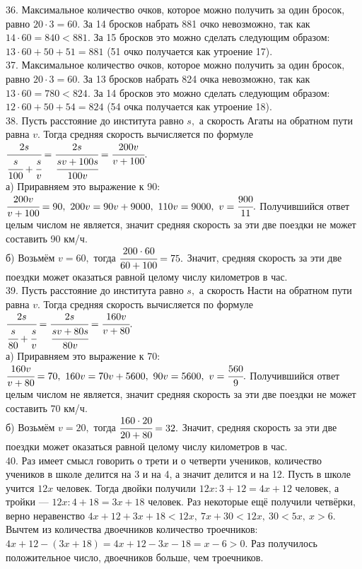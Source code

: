 \documentclass[12pt]{article}
\begin{document}
36. Максимальное количество очков, которое можно получить за один бросок, равно $20\cdot3=60.$ За 14 бросков набрать 881 очко невозможно, так как $14\cdot60=840<881.$ За 15 бросков это можно сделать следующим образом: $13\cdot60+50+51=881$ (51 очко получается как утроение 17).\\
37. Максимальное количество очков, которое можно получить за один бросок, равно $20\cdot3=60.$ За 13 бросков набрать 824 очка невозможно, так как $13\cdot60=780<824.$ За 14 бросков это можно сделать следующим образом: $12\cdot60+50+54=824$ (54 очка получается как утроение 18).\\
38. Пусть расстояние до института равно $s,$ а скорость Агаты на обратном пути равна $v.$ Тогда средняя скорость вычисляется по формуле $\cfrac{2s}{\cfrac{s}{100}+\cfrac{s}{v}}=\cfrac{2s}{\cfrac{sv+100s}{100v}}=\cfrac{200v}{v+100}.$\\
а) Приравняем это выражение к 90: $\cfrac{200v}{v+100}=90,\ 200v=90v+9000,\ 110v=9000,\ v=\cfrac{900}{11}.$ Получившийся ответ целым числом не является, значит средняя скорость за эти две поездки не может составить 90 км/ч.\\
б) Возьмём $v=60,$ тогда $\cfrac{200\cdot60}{60+100}=75.$ Значит, средняя скорость за эти две поездки может оказаться равной целому числу километров в час.\\
39. Пусть расстояние до института равно $s,$ а скорость Насти на обратном пути равна $v.$ Тогда средняя скорость вычисляется по формуле $\cfrac{2s}{\cfrac{s}{80}+\cfrac{s}{v}}=\cfrac{2s}{\cfrac{sv+80s}{80v}}=\cfrac{160v}{v+80}.$\\
а) Приравняем это выражение к 70: $\cfrac{160v}{v+80}=70,\ 160v=70v+5600,\ 90v=5600,\ v=\cfrac{560}{9}.$ Получившийся ответ целым числом не является, значит средняя скорость за эти две поездки не может составить 70 км/ч.\\
б) Возьмём $v=20,$ тогда $\cfrac{160\cdot20}{20+80}=32.$ Значит, средняя скорость за эти две поездки может оказаться равной целому числу километров в час.\\
40. Раз имеет смысл говорить о трети и о четверти учеников, количество учеников в школе делится на 3 и на 4, а значит делится и на 12. Пусть в школе учится $12x$ человек. Тогда двойки получили $12x:3+12=4x+12$ человек, а тройки --- $12x:4+18=3x+18$ человек. Раз некоторые ещё получили четвёрки, верно неравенство $4x+12+3x+18<12x,\ 7x+30<12x,\ 30<5x,\ x>6.$ Вычтем из количества двоечников количество троечников: $4x+12-(3x+18)=4x+12-3x-18=x-6>0.$ Раз получилось положительное число, двоечников больше, чем троечников.\\
\end{document}
